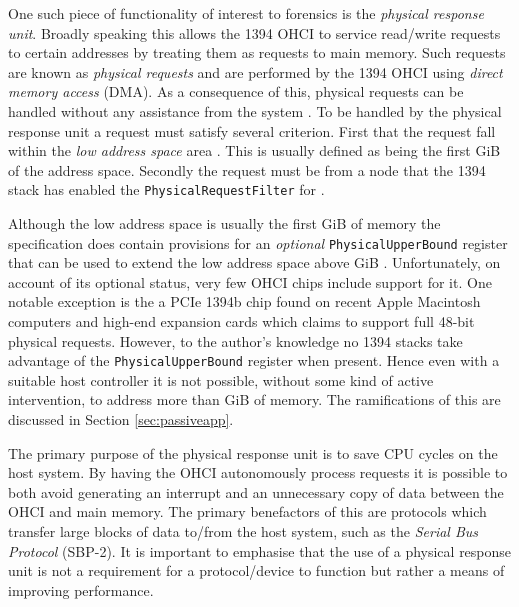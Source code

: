 \documentclass[numbers=noenddot,      %
               abstract,              %
               captions=tableheading, %
               DIV=8]                 %
              {scrartcl}
\begin{document}
One such piece of functionality of interest to forensics is the
\emph{physical response unit}. Broadly speaking this allows the 1394
OHCI to service read/write requests to certain addresses by treating
them as requests to main memory. Such requests are known as
\emph{physical requests} and are performed by the 1394 OHCI using
\emph{direct memory access} (DMA). As a consequence of this, physical
requests can be handled without any assistance from the system
\citep[][section 3.3]{ohci00}. To be handled by the physical response
unit a request must satisfy several criterion. First that the request
fall within the \emph{low address space} area \citep[][section
1.5]{ohci00}. This is usually defined as being the first \unit[4]{GiB}
of the address space. Secondly the request must be from a node that the
1394 stack has enabled the \verb:PhysicalRequestFilter: for
\citep[][section 5.14.2]{ohci00}.

Although the low address space is usually the first \unit[4]{GiB} of
memory the specification does contain provisions for an \emph{optional}
\verb:PhysicalUpperBound: register that can be used to extend the low
address space above \unit[4]{GiB} \citep[][section
5.15]{ohci00}. Unfortunately, on account of its optional status, very
few OHCI chips include support for it. One notable exception is the
\cite{lsi07} a PCIe 1394b chip found on recent Apple Macintosh computers
and high-end expansion cards which claims to support full 48-bit
physical requests. However, to the author's knowledge no 1394 stacks
take advantage of the \verb:PhysicalUpperBound: register when
present. Hence even with a suitable host controller it is not possible,
without some kind of active intervention, to address more than
\unit[4]{GiB} of memory. The ramifications of this are discussed in
Section \ref{sec:passiveapp}.

The primary purpose of the physical response unit is to save CPU cycles
on the host system. By having the OHCI autonomously process requests it
is possible to both avoid generating an interrupt and an unnecessary
copy of data between the OHCI and main memory. The primary benefactors
of this are protocols which transfer large blocks of data to/from the
host system, such as the \emph{Serial Bus Protocol} (SBP-2). It is
important to emphasise that the use of a physical response unit is not a
requirement for a protocol/device to function but rather a means of
improving performance.
\end{document}
